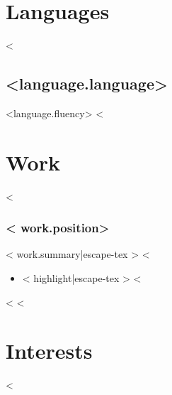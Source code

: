 \documentclass{resume}
\begin{document}
\section{Languages}
\begin{multicols}{2}
  <%
  \subsection{<{language.language}>}
  <{language.fluency}>
  <%
\end{multicols}
\section{Work}
<%
\subsubsection{<{ work.position}>}
<{ work.summary|escape-tex }>
<%
\begin{itemize}
<%
  \item <{ highlight|escape-tex }>
<%
\end{itemize}
<%
<%
\section{Interests}
<%
\end{document}
